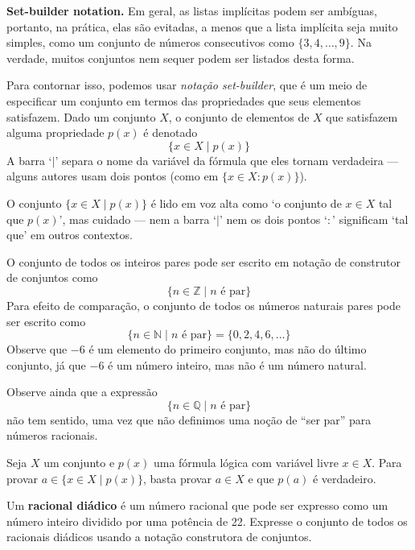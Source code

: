 \textbf{Set-builder notation.}
Em geral, as listas implícitas podem ser ambíguas, portanto, na prática, elas são evitadas, a menos que a lista implícita seja muito simples, como um conjunto de números consecutivos como $\{3, 4, \dots, 9 \}$. Na verdade, muitos conjuntos nem sequer podem ser listados desta forma.

Para contornar isso, podemos usar \textit{notação set-builder}, que é um meio de especificar um conjunto em termos das propriedades que seus elementos satisfazem. Dado um conjunto $X$, o conjunto de elementos de $X$ que satisfazem alguma propriedade $p(x)$ é denotado
\[ \{ x \in X \mid p(x) \} \]
A barra `$\mid$'  separa o nome da variável da fórmula que eles tornam verdadeira --- alguns autores usam dois pontos (como em $\{ x \in X : p(x) \}$).

O conjunto $\{ x \in X \mid p(x) \}$ é lido em voz alta como `o conjunto de $x \in X$ tal que $p(x)$', mas cuidado --- nem a barra `$\mid$' nem os dois pontos `$:$' significam `tal que' em outros contextos.

\begin{example}
\label{exSetsSpecifyUniverses}
O conjunto de todos os inteiros pares pode ser escrito em notação de construtor de conjuntos como
\[ \{ n \in \mathbb{Z} \mid n \text{ é par} \} \]
Para efeito de comparação, o conjunto de todos os números naturais pares pode ser escrito como
\[ \{ n \in \mathbb{N} \mid n \text{ é par} \} = \{ 0, 2, 4, 6, \dots \} \]
Observe que $-6$ é um elemento do primeiro conjunto, mas não do último conjunto, já que $-6$ é um número inteiro, mas não é um número natural.

Observe ainda que a expressão
\[ \{ n \in \mathbb{Q} \mid n \text{ é par} \} \]
não tem sentido, uma vez que não definimos uma noção de “ser par” para números racionais.
\end{example}

\begin{strategy}
Seja $X$ um conjunto e $p(x)$ uma fórmula lógica com variável livre $x \in X$. Para provar $a \in \{ x \in X \mid p(x) \}$, basta provar $a \in X$ e que $p(a)$ é verdadeiro.
\end{strategy}

\begin{exercise}
\label{exDyadicRatioal}
Um \textbf{racional diádico} é um número racional que pode ser expresso como um número inteiro dividido por uma potência de 22. Expresse o conjunto de todos os racionais diádicos usando a notação construtora de conjuntos.
\end{exercise}

